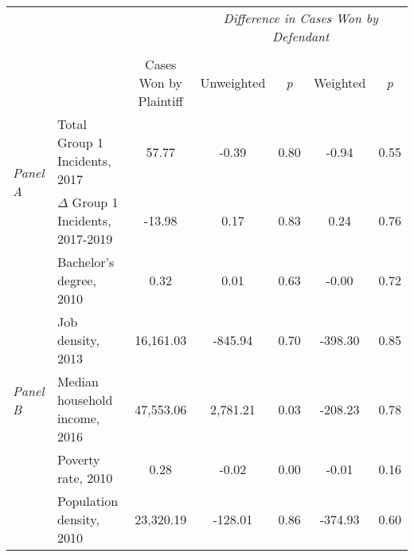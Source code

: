 \begin{tabular}{llccccc}
\toprule
 &  & \textit{} & \multicolumn{4}{c}{\textit{Difference in Cases Won by Defendant}} \\
\cline{4-7}
\\
 &  & Cases Won by Plaintiff & Unweighted & \emph{p} & Weighted & \emph{p} \\
\midrule
\multirow[c]{2}{.75cm}{\textit{Panel A}} & Total Group 1 Incidents, 2017 & 57.77 & -0.39 & 0.80 & -0.94 & 0.55 \\
 & $\Delta$ Group 1 Incidents, 2017-2019 & -13.98 & 0.17 & 0.83 & 0.24 & 0.76 \\
\cline{1-7}
\multirow[c]{5}{.75cm}{\textit{Panel B}} & Bachelor's degree, 2010 & 0.32 & 0.01 & 0.63 & -0.00 & 0.72 \\
 & Job density, 2013 & 16,161.03 & -845.94 & 0.70 & -398.30 & 0.85 \\
 & Median household income, 2016 & 47,553.06 & 2,781.21 & 0.03 & -208.23 & 0.78 \\
 & Poverty rate, 2010 & 0.28 & -0.02 & 0.00 & -0.01 & 0.16 \\
 & Population density, 2010 & 23,320.19 & -128.01 & 0.86 & -374.93 & 0.60 \\
\cline{1-7}
\bottomrule
\end{tabular}
